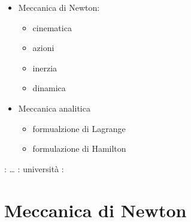 \documentclass[letterpaper,10pt,english]{jupyterBook}
\begin{document}
\sphinxAtStartPar
{}
\begin{itemize}
\item {} 
\sphinxAtStartPar
Meccanica di Newton:
\begin{itemize}
\item {} 
\sphinxAtStartPar
cinematica

\item {} 
\sphinxAtStartPar
azioni

\item {} 
\sphinxAtStartPar
inerzia

\item {} 
\sphinxAtStartPar
dinamica

\end{itemize}

\item {} 
\sphinxAtStartPar
Meccanica analitica
\begin{itemize}
\item {} 
\sphinxAtStartPar
formualzione di Lagrange

\item {} 
\sphinxAtStartPar
formulazione di Hamilton

\end{itemize}

\end{itemize}

\sphinxAtStartPar
{}: … 
: università 
:



\sphinxstepscope


\part{Meccanica di Newton}

\sphinxstepscope
\end{document}
